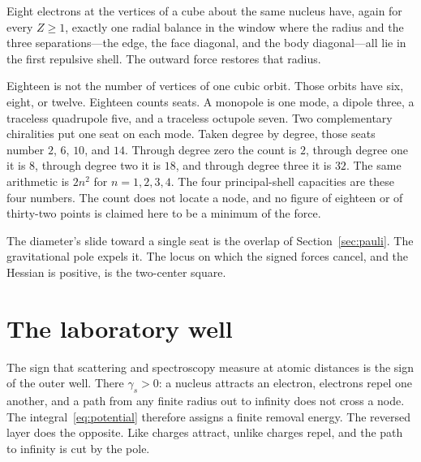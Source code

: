 \documentclass[a4paper]{article}
\begin{document}
Eight electrons at the vertices of a cube about the same nucleus have, again for every \(Z\ge 1\), exactly one radial balance in the window where the radius and the three separations---the edge, the face diagonal, and the body diagonal---all lie in the first repulsive shell. The outward force restores that radius.

Eighteen is not the number of vertices of one cubic orbit. Those orbits have six, eight, or twelve. Eighteen counts seats. A monopole is one mode, a dipole three, a traceless quadrupole five, and a traceless octupole seven. Two complementary chiralities put one seat on each mode. Taken degree by degree, those seats number \(2\), \(6\), \(10\), and \(14\). Through degree zero the count is \(2\), through degree one it is \(8\), through degree two it is \(18\), and through degree three it is \(32\). The same arithmetic is \(2n^{2}\) for \(n=1,2,3,4\). The four principal-shell capacities are these four numbers. The count does not locate a node, and no figure of eighteen or of thirty-two points is claimed here to be a minimum of the force.

The diameter's slide toward a single seat is the overlap of Section~\ref{sec:pauli}. The gravitational pole expels it. The locus on which the signed forces cancel, and the Hessian is positive, is the two-center square.

\section{The laboratory well}
\label{sec:lab}

The sign that scattering and spectroscopy measure at atomic distances is the sign of the outer well. There \(\gamma_s>0\): a nucleus attracts an electron, electrons repel one another, and a path from any finite radius out to infinity does not cross a node. The integral~\eqref{eq:potential} therefore assigns a finite removal energy. The reversed layer does the opposite. Like charges attract, unlike charges repel, and the path to infinity is cut by the pole.
\end{document}
